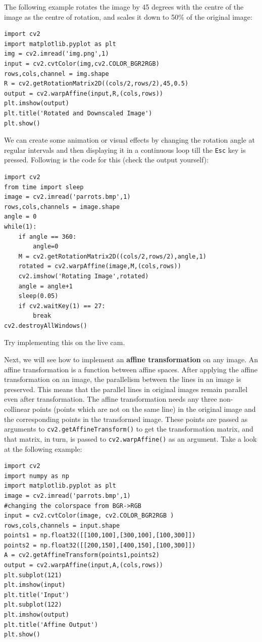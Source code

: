 \documentclass{labo}
\begin{document}
The following example rotates the image by 45 degrees with the centre of the image as the centre of rotation, and scales it down to 50\% of the original image:

\begin{verbatim}
import cv2 
import matplotlib.pyplot as plt 
img = cv2.imread('img.png',1) 
input = cv2.cvtColor(img,cv2.COLOR_BGR2RGB) 
rows,cols,channel = img.shape 
R = cv2.getRotationMatrix2D((cols/2,rows/2),45,0.5) 
output = cv2.warpAffine(input,R,(cols,rows)) 
plt.imshow(output)
plt.title('Rotated and Downscaled Image') 
plt.show()
\end{verbatim}
We can create some animation or visual effects by changing the rotation angle at regular intervals and then displaying it in a continuous loop till the \texttt{Esc} key is pressed. Following is the code for this (check the output yourself):

\begin{verbatim}
import cv2 
from time import sleep 
image = cv2.imread('parrots.bmp',1) 
rows,cols,channels = image.shape 
angle = 0 
while(1): 
	if angle == 360: 
		angle=0 
	M = cv2.getRotationMatrix2D((cols/2,rows/2),angle,1) 
	rotated = cv2.warpAffine(image,M,(cols,rows)) 
	cv2.imshow('Rotating Image',rotated) 
	angle = angle+1 
	sleep(0.05) 
	if cv2.waitKey(1) == 27: 
		break 
cv2.destroyAllWindows()
\end{verbatim}

\begin{leftbar}
Try implementing this on the live cam.
\end{leftbar}

Next, we will see how to implement an \textbf{affine transformation} on any image. An affine transformation is a function between affine spaces. After applying the affine transformation on an image, the parallelism between the lines in an image is preserved. This means that the parallel lines in original images remain parallel even after transformation. The affine transformation needs any three non-collinear points (points which are not on the same line) in the original image and the corresponding points in the transformed image. These points are passed as arguments to \texttt{cv2.getAffineTransform()} to get the transformation matrix, and that matrix, in turn, is passed to \texttt{cv2.warpAffine()} as an argument. Take a look at the following example:

\begin{verbatim}
import cv2 
import numpy as np 
import matplotlib.pyplot as plt 
image = cv2.imread('parrots.bmp',1) 
#changing the colorspace from BGR->RGB 
input = cv2.cvtColor(image, cv2.COLOR_BGR2RGB ) 
rows,cols,channels = input.shape 
points1 = np.float32([[100,100],[300,100],[100,300]]) 
points2 = np.float32([[200,150],[400,150],[100,300]]) 
A = cv2.getAffineTransform(points1,points2) 
output = cv2.warpAffine(input,A,(cols,rows)) 
plt.subplot(121)
plt.imshow(input)
plt.title('Input') 
plt.subplot(122)
plt.imshow(output)
plt.title('Affine Output') 
plt.show()
\end{verbatim}
\end{document}
